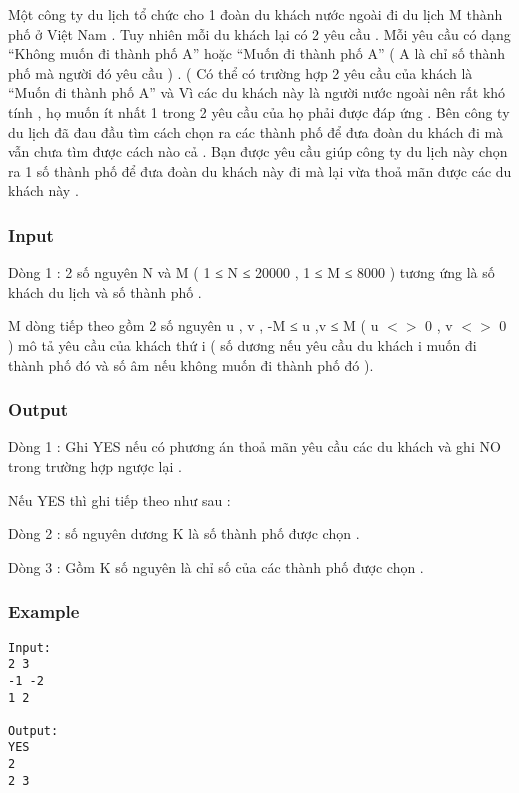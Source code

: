 



   Một công ty du lịch tổ chức cho 1 đoàn du khách nước ngoài đi du lịch M thành phố ở Việt Nam . Tuy nhiên mỗi du khách lại có 2 yêu cầu . Mỗi yêu cầu có dạng “Không muốn đi thành phố A” hoặc “Muốn đi thành phố A” ( A là chỉ số thành phố mà người đó yêu cầu ) . ( Có thể có trường hợp 2 yêu cầu của khách là “Muốn đi thành phố A” và  Vì các du khách này là người nước ngoài nên rất khó tính , họ muốn ít nhất  1 trong 2 yêu cầu của họ phải được đáp ứng . Bên công ty du lịch đã đau đầu tìm cách chọn ra các thành phố để đưa đoàn du khách đi mà vẫn chưa tìm được cách nào cả . Bạn được yêu cầu giúp công ty du lịch này chọn ra 1 số thành phố để đưa đoàn du khách này đi mà lại vừa thoả mãn được các du khách này .  

\subsubsection{   Input  }

   Dòng 1 : 2 số nguyên N và M ( 1 ≤ N ≤ 20000 , 1 ≤ M ≤ 8000 ) tương ứng là số khách du lịch và số thành phố .   


   M dòng tiếp theo gồm 2 số nguyên u , v , -M ≤ u ,v ≤ M ( u $<$$>$ 0 , v $<$$>$ 0 ) mô tả yêu cầu của khách thứ i ( số dương nếu yêu cầu du khách i muốn đi thành phố đó và số âm nếu không muốn đi thành phố đó ).   




\subsubsection{   Output  }

   Dòng 1 : Ghi YES nếu có phương án thoả mãn yêu cầu các du khách và ghi NO trong trường hợp ngược lại .   


   Nếu YES thì ghi tiếp theo như sau :   


   Dòng 2 : số nguyên dương K là số thành phố được chọn .   


   Dòng 3 : Gồm K số nguyên là chỉ số của các thành phố được chọn .  

\subsubsection{   Example  }
\begin{verbatim}
Input:
2 3
-1 -2
1 2

Output:
YES
2
2 3
\end{verbatim}
